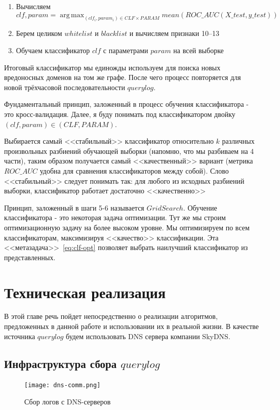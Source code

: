\documentclass[14pt]{extreport} %
\DeclareMathOperator*{\argmaxA}{arg\,max}
\begin{document}
\begin{enumerate}
\begin{enumerate}
	      \end{enumerate}
	      	      	
	\item Вычисляем
	      \begin{equation}
	      	\label{eq:clf-opt}
	      	clf, param = \argmaxA_{(clf_i, param_i) \in CLF\times PARAM}mean(ROC\_AUC(X\_test, y\_test))
	      \end{equation}
	\item Берем целиком $whitelist$ и $blacklist$ и вычисляем признаки 10--13
	\item Обучаем классификатор $clf$ с параметрами $param$ на всей выборке
\end{enumerate}
	
	
Итоговый классификатор мы единожды используем для поиска новых вредоносных доменов на том же графе. После чего процесс повторяется для новой трёхчасовой последовательности $querylog$.
	
Фундаментальный принцип, заложенный в процесс обучения классификатора - это кросс-валидация. Далее, я буду понимать под классификатором двойку $(clf, param) \in (CLF, PARAM)$. 
	
Выбирается самый <<стабильный>> классификатор относительно $k$ различных произвольных разбиений обучающей выборки (напомню, что мы разбиваем на 4 части), таким образом получается самый <<качественный>> вариант (метрика $ROC\_AUC$ удобна для сравнения классификаторов между собой). Слово <<стабильный>> следует понимать так: для любого из исходных разбиений выборки, классификатор работает достаточно <<качественно>>
	
Принцип, заложенный в шаги 5-6 называется $GridSearch$. Обучение классификатора - это некоторая задача оптимизации. Тут же мы строим оптимизационную задачу на более высоком уровне. Мы оптимизируем по всем классификаторам, максимизируя <<качество>> классификации. Эта <<метазадача>>~\eqref{eq:clf-opt} позволяет выбрать наилучший классификатор из представленных.
	

\chapter{Техническая реализация}
В этой главе речь пойдет непосредственно о реализации алгоритмов, предложенных в данной работе и использовании их в реальной жизни. В качестве источника $querylog$ будем использовать DNS сервера компании SkyDNS. 

\section{Инфраструктура сбора $querylog$}
\begin{figure}[H]
	\center
	\texttt{[image: dns-comm.png]}
	\caption{Сбор логов с DNS-серверов}
			
	\label{fig:collect-log}
\end{figure}
\end{document}
